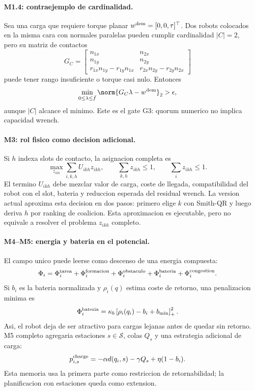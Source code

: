 \paragraph{M1.4: contraejemplo de cardinalidad.}
Sea una carga que requiere torque planar $w^{\rm dem}=[0,0,\tau]^\top$. Dos robots
colocados en la misma cara con normales paralelas pueden cumplir cardinalidad
$|C|=2$, pero su matriz de contactos
\[
  G_C=\begin{bmatrix}
  n_{1x} & n_{2x}\\
  n_{1y} & n_{2y}\\
  r_{1x}n_{1y}-r_{1y}n_{1x} &
  r_{2x}n_{2y}-r_{2y}n_{2x}
  \end{bmatrix}
\]
puede tener rango insuficiente o torque casi nulo. Entonces
\[
  \min_{0\le \lambda\le \bar f}\norm{G_C\lambda-w^{\rm dem}}_2>\epsilon ,
\]
aunque $|C|$ alcance el minimo. Este es el gate G3: quorum numerico no implica capacidad
wrench.

\paragraph{M3: rol fisico como decision adicional.}
Si $h$ indexa slots de contacto, la asignacion completa es
\[
  \max_{z_{ikh}}\sum_{i,k,h} U_{ikh}z_{ikh},
  \qquad
  \sum_{k,h}z_{ikh}\le 1,\qquad
  \sum_i z_{ikh}\le 1 .
\]
El termino $U_{ikh}$ debe mezclar valor de carga, coste de llegada, compatibilidad del
robot con el slot, bateria y reduccion esperada del residual wrench. La version actual
aproxima esta decision en dos pasos: primero elige $k$ con Smith-QR y luego deriva $h$
por ranking de coalicion. Esta aproximacion es ejecutable, pero no equivale a resolver
el problema $z_{ikh}$ completo.

\paragraph{M4--M5: energia y bateria en el potencial.}
El campo unico puede leerse como descenso de una energia compuesta:
\[
  \Phi_i =
  \Phi_i^{\rm tarea}+\Phi_i^{\rm formacion}+\Phi_i^{\rm obstaculo}
  +\Phi_i^{\rm bateria}+\Phi_i^{\rm congestion}.
\]
Si $b_i$ es la bateria normalizada y $\rho_i(q)$ estima coste de retorno, una penalizacion
minima es
\[
  \Phi_i^{\rm bateria} =
  \kappa_b \left[\rho_i(q_i)-b_i+b_{\min}\right]_+^2 .
\]
Asi, el robot deja de ser atractivo para cargas lejanas antes de quedar sin retorno. M5
completo agregaria estaciones $s\in\mathcal S$, colas $Q_s$ y una estrategia adicional de
carga:
\[
  p_{i,s}^{\rm charge}= -\alpha d(q_i,s)-\gamma Q_s+\eta(1-b_i).
\]
Esta memoria usa la primera parte como restriccion de retornabilidad; la planificacion
con estaciones queda como extension.
